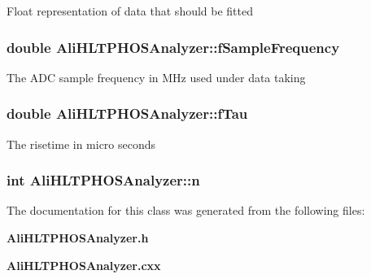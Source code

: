 Float representation of data that should be fitted 
\subsubsection{\setlength{\rightskip}{0pt plus 5cm}double {\bf Ali\-HLTPHOSAnalyzer::f\-Sample\-Frequency}\hspace{0.3cm}{\tt  [protected]}}\label{classAliHLTPHOSAnalyzer_p1}


The ADC sample frequency in MHz used under data taking 
\subsubsection{\setlength{\rightskip}{0pt plus 5cm}double {\bf Ali\-HLTPHOSAnalyzer::f\-Tau}\hspace{0.3cm}{\tt  [protected]}}\label{classAliHLTPHOSAnalyzer_p4}


The risetime in micro seconds 
\subsubsection{\setlength{\rightskip}{0pt plus 5cm}int {\bf Ali\-HLTPHOSAnalyzer::n}\hspace{0.3cm}{\tt  [protected]}}\label{classAliHLTPHOSAnalyzer_p7}




The documentation for this class was generated from the following files:\begin{CompactItemize}
\item 
{\bf Ali\-HLTPHOSAnalyzer.h}\item 
{\bf Ali\-HLTPHOSAnalyzer.cxx}\end{CompactItemize}
